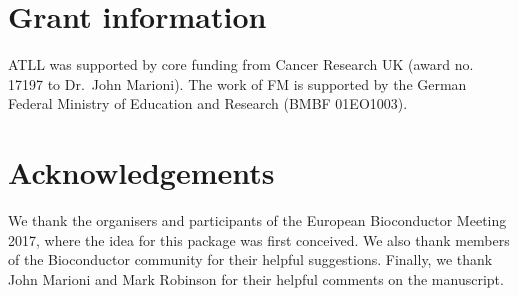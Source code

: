 \documentclass[10pt,a4paper,twocolumn]{article}
\begin{document}
\section*{Grant information}
ATLL was supported by core funding from Cancer Research UK (award no. 17197 to Dr.\ John Marioni).
The work of FM is supported by the German Federal Ministry of Education and Research (BMBF 01EO1003).

\section*{Acknowledgements}
We thank the organisers and participants of the European Bioconductor Meeting 2017, where the idea for this package was first conceived.
We also thank members of the Bioconductor community for their helpful suggestions.
Finally, we thank John Marioni and Mark Robinson for their helpful comments on the manuscript.

{\small
}

\bigskip





\end{document}
